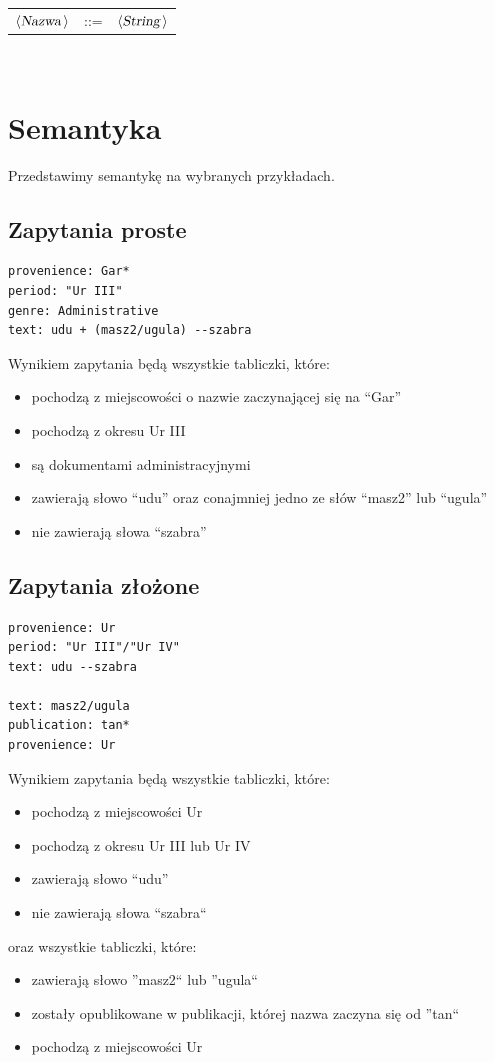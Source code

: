 \documentclass{pracamgr}
\newcommand{\nonterminal}[1]{\mbox{$\langle \mbox{{\sl #1 }} \! \rangle$}}
\newcommand{\arrow}{\mbox{::=}}
\begin{document}
\begin{tabular}{lll}
{\nonterminal{Nazwa}} & {\arrow}  &{\nonterminal{String}}  \\
\end{tabular}\\

\section{Semantyka}
Przedstawimy semantykę na wybranych przykładach.
\subsection{Zapytania proste}
\begin{verbatim}
provenience: Gar*
period: "Ur III"
genre: Administrative
text: udu + (masz2/ugula) --szabra
\end{verbatim}
Wynikiem zapytania będą wszystkie tabliczki, które:
\begin{itemize}
 \item pochodzą z miejscowości o nazwie zaczynającej się na ``Gar''
\item pochodzą z okresu Ur III
\item są dokumentami administracyjnymi
\item zawierają słowo ``udu'' oraz conajmniej jedno ze słów ``masz2'' lub ``ugula''
\item nie zawierają słowa ``szabra''
\end{itemize}


\subsection{Zapytania złożone}
\begin{verbatim}
provenience: Ur
period: "Ur III"/"Ur IV"
text: udu --szabra

text: masz2/ugula
publication: tan*
provenience: Ur
\end{verbatim}
Wynikiem zapytania będą wszystkie tabliczki, które:
\begin{itemize}
 \item pochodzą z miejscowości Ur
 \item pochodzą z okresu Ur III lub Ur IV
 \item zawierają słowo ``udu''
 \item nie zawierają słowa ``szabra``
\end{itemize}
oraz wszystkie tabliczki, które:
\begin{itemize}
 \item zawierają słowo ''masz2`` lub ''ugula``
 \item zostały opublikowane w publikacji, której nazwa zaczyna się od ''tan``
 \item pochodzą z miejscowości Ur
\end{itemize}
\end{document}
